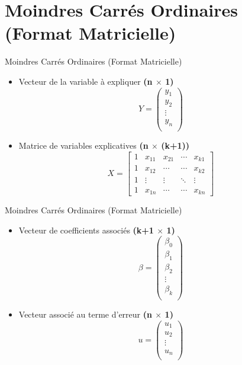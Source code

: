 \documentclass{beamer}
\begin{document}
\section{Moindres Carrés Ordinaires (Format Matricielle)}

\frame{\tableofcontents[current]}

\begin{frame}{Moindres Carrés Ordinaires (Format Matricielle)}
\begin{itemize}

\item Vecteur de la variable à expliquer \textbf{(n $\times$ 1)}
$$Y=\begin{pmatrix}
y_1\\ 
y_2\\ 
\vdots\\
y_n\\
\end{pmatrix}$$
\item Matrice de variables explicatives \textbf{(n $\times$ (k+1))}
$$X=\begin{bmatrix}
 1&x_{11}  &x_{21}  &\cdots   &x_{k1} \\ 
 1&x_{12}  &\cdots  & \cdots &x_{k2} \\ 
 1& \vdots  & \vdots  & \ddots  & \vdots\\ 
 1&x_{1n}  & \cdots & \cdots &x_{kn}
\end{bmatrix}$$
\end{itemize}
\end{frame}

\begin{frame}{Moindres Carrés Ordinaires (Format Matricielle)}
\begin{itemize}
\item Vecteur de coefficients associés \textbf{(k+1 $\times$ 1)}
$$\beta=\begin{pmatrix}
\beta_0\\ 
\beta_1\\ 
\beta_2\\ 
\vdots\\
\beta_k\\
\end{pmatrix}$$
\item Vecteur associé au terme d'erreur \textbf{(n $\times$ 1)}
$$u=\begin{pmatrix}
u_1\\ 
u_2\\ 
\vdots\\
u_n\\
\end{pmatrix}$$
\end{itemize}
\end{frame}
\end{document}
